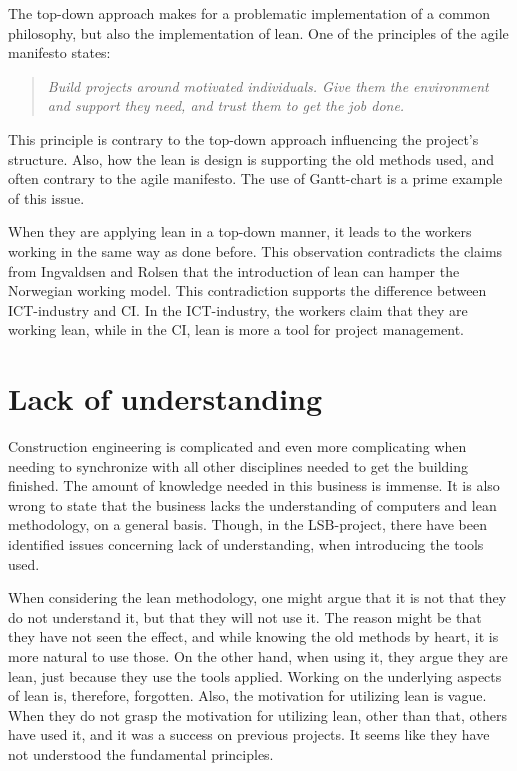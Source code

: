 The top-down approach makes for a problematic implementation of a common philosophy, but also the implementation of lean. One of the principles of the agile manifesto \cite{agile_manifesto} states:
\begin{quote}
    \textit{Build projects around motivated individuals. Give them the environment and support they need, and trust them to get the job done.}
\end{quote}

This principle is contrary to the top-down approach influencing the project's structure. Also, how the lean is design is supporting the old methods used, and often contrary to the agile manifesto. The use of Gantt-chart is a prime example of this issue. 

When they are applying lean in a top-down manner, it leads to the workers working in the same way as done before. This observation contradicts the claims from Ingvaldsen and Rolsen that the introduction of lean can hamper the Norwegian working model. This contradiction supports the difference between ICT-industry and CI. In the ICT-industry, the workers claim that they are working lean, while in the CI, lean is more a tool for project management.

\section{Lack of understanding} \label{sec:dis_understanding}
Construction engineering is complicated and even more complicating when needing to synchronize with all other disciplines needed to get the building finished. The amount of knowledge needed in this business is immense. It is also wrong to state that the business lacks the understanding of computers and lean methodology, on a general basis. Though, in the LSB-project, there have been identified issues concerning lack of understanding, when introducing the tools used. 

When considering the lean methodology, one might argue that it is not that they do not understand it, but that they will not use it. The reason might be that they have not seen the effect, and while knowing the old methods by heart, it is more natural to use those. On the other hand, when using it, they argue they are lean, just because they use the tools applied. Working on the underlying aspects of lean is, therefore, forgotten. Also, the motivation for utilizing lean is vague. When they do not grasp the motivation for utilizing lean, other than that, others have used it, and it was a success on previous projects. It seems like they have not understood the fundamental principles. 

